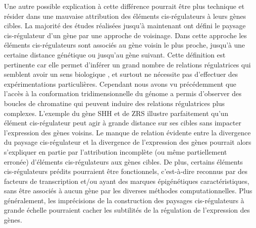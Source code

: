 Une autre possible explication à cette différence pourrait être plus technique et résider dans une mauvaise attribution des éléments \gls{cis}-régulateurs à leurs gènes cibles. La majorité des études réalisées jusqu’à maintenant ont défini le paysage \gls{cis}-régulateur d’un gène par une approche de voisinage. Dans cette approche les éléments \gls{cis}-régulateurs sont associés au gène voisin le plus proche, jusqu’à une certaine distance génétique ou jusqu’au gène suivant. Cette définition est pertinente car elle permet d’inférer un grand nombre de relations régulatrices qui semblent avoir un sens biologique \citep{kundaje_integrative_2015}, et surtout ne nécessite pas d’effectuer des expérimentations particulières. Cependant nous avons vu précédemment que l’accès à la conformation tridimensionnelle du génome a permis d’observer des boucles de chromatine qui peuvent induire des relations régulatrices plus complexes. L’exemple du gène \acrshort{SHH} et de \acrshort{ZRS} illustre parfaitement qu’un élément \gls{cis}-régulateur peut agir à grande distance sur ses cibles sans impacter l’expression des gènes voisins. Le manque de relation évidente entre la divergence du paysage \gls{cis}-régulateur et la divergence de l’expression des gènes pourrait alors s’expliquer en partie par l’attribution incomplète (ou même partiellement erronée) d’éléments \gls{cis}-régulateurs aux gènes cibles. De plus, certains éléments \gls{cis}-régulateurs prédits pourraient être fonctionnels, c’est-à-dire reconnus par des facteurs de transcription et/ou ayant des marques épigénétiques caractéristiques, sans être associés à aucun gène par les diverses méthodes computationnelles. Plus généralement, les imprécisions de la construction des paysages \gls{cis}-régulateurs à grande échelle pourraient cacher les subtilités de la régulation de l’expression des gènes. \\
